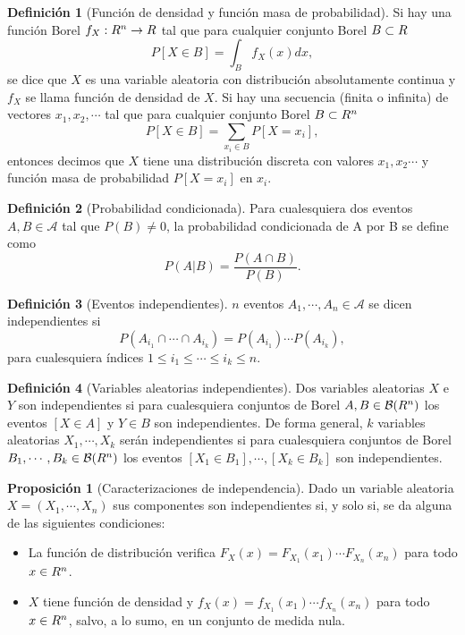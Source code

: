 \documentclass[10pt,a4paper]{article} %
\let\mathbb\relax
\theoremstyle{definition}
\newtheorem{definition}{Definición}[section]
\newtheorem{proposition}[theorem]{Proposición}
\begin{document}
\begin{definition}[Función de densidad y función masa de probabilidad]
  Si hay una función Borel $f_X:\mathbb{R}^n\to \mathbb{R}$ tal que para cualquier conjunto Borel $B\subset \mathbb{R}$\[
P[X\in B] = \int_B f_X(x) dx,
\]
se dice que $X$ es una variable aleatoria con distribución absolutamente continua y $f_X$ se llama función de densidad de $X$. Si hay una secuencia (finita o infinita) de vectores $x_1,x_2,\cdots$ tal que para cualquier conjunto Borel $B\subset \mathbb{R}^n$\[
P[X\in B] = \sum_{x_i\in B}P[X = x_i],
\]
entonces decimos que $X$ tiene una distribución discreta con valores $x_1,x_2\cdots$ y función masa de probabilidad $P[X=x_i]$ en $x_i$.
\end{definition}

  

\begin{definition}[Probabilidad condicionada]
  Para cualesquiera dos eventos $A,B \in \mathcal{A}$ tal que $P(B)\neq 0$, la probabilidad condicionada de A por B se define como\[
P(A|B) = \frac{P(A\cap B)}{P(B)}.
  \]
\end{definition}

\begin{definition}[Eventos independientes]
  $n$ eventos $A_1,\cdots,A_n\in \mathcal{A}$ se dicen independientes si\[
P(A_{i_1}\cap\cdots\cap A_{i_k}) = P(A_{i_1})\cdots P(A_{i_k}),
\]
para cualesquiera índices $1\leq i_1\leq \cdots \leq i_k\leq n$.
\end{definition}

\begin{definition}[Variables aleatorias independientes]
  Dos variables aleatorias $X$ e $Y$ son independientes si para cualesquiera conjuntos de Borel $A, B \in \mathcal{B}(\mathbb{R}^n)$ los eventos $[X\in A]$ y $Y\in B$ son independientes. De forma general, $k$ variables aleatorias $X_1,\cdots,X_k$ serán independientes si para cualesquiera conjuntos de Borel $B_1,\cdots,B_k \in \mathcal{B}(\mathbb{R}^n)$ los eventos $[X_1 \in B_1],\cdots,[X_k\in B_k]$ son independientes.
\end{definition}

\begin{proposition}[Caracterizaciones de independencia]
  Dado un variable aleatoria $X =(X_1,\cdots,X_n)$ sus componentes son independientes si, y solo si, se da alguna de las siguientes condiciones:
  \begin{itemize}
  \item La función de distribución verifica $F_X(x) = F_{X_1}(x_1)\cdots F_{X_n}(x_n)$ para todo $x \in \mathbb{R}^n$.
  \item $X$ tiene función de densidad y $f_X(x) = f_{X_1}(x_1)\cdots f_{X_n}(x_n)$ para todo $x \in \mathbb{R}^n$, salvo, a lo sumo, en un conjunto de medida nula.
  \end{itemize}
\end{proposition}
\end{document}
